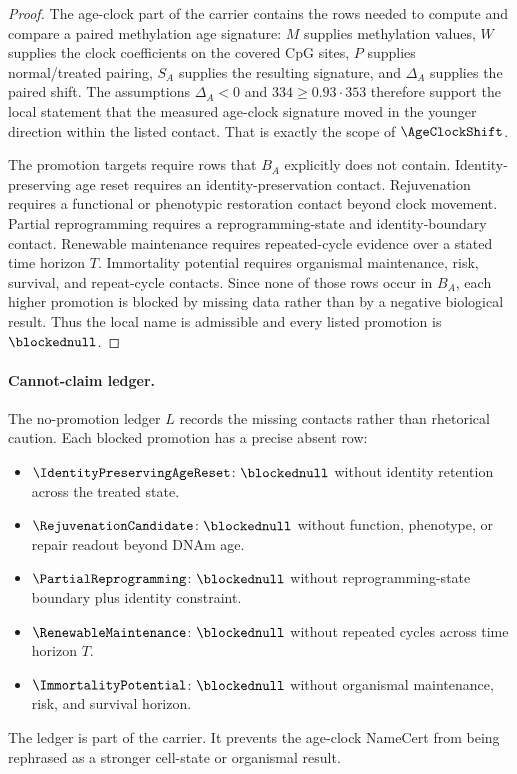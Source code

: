\begin{proof}
The age-clock part of the carrier contains the rows needed to compute and compare a paired methylation age signature: $M$ supplies methylation values, $W$ supplies the clock coefficients on the covered CpG sites, $P$ supplies normal/treated pairing, $S_A$ supplies the resulting signature, and $\Delta_A$ supplies the paired shift. The assumptions $\Delta_A<0$ and $334\geq 0.93\cdot 353$ therefore support the local statement that the measured age-clock signature moved in the younger direction within the listed contact. That is exactly the scope of $\AgeClockShift$.

The promotion targets require rows that $B_A$ explicitly does not contain. Identity-preserving age reset requires an identity-preservation contact. Rejuvenation requires a functional or phenotypic restoration contact beyond clock movement. Partial reprogramming requires a reprogramming-state and identity-boundary contact. Renewable maintenance requires repeated-cycle evidence over a stated time horizon $T$. Immortality potential requires organismal maintenance, risk, survival, and repeat-cycle contacts. Since none of those rows occur in $B_A$, each higher promotion is blocked by missing data rather than by a negative biological result. Thus the local name is admissible and every listed promotion is $\blockednull$.
\end{proof}

\paragraph{Cannot-claim ledger.}
The no-promotion ledger $L$ records the missing contacts rather than rhetorical caution. Each blocked promotion has a precise absent row:
\begin{itemize}[leftmargin=2em]
\item $\IdentityPreservingAgeReset$: $\blockednull$ without identity retention across the treated state.
\item $\RejuvenationCandidate$: $\blockednull$ without function, phenotype, or repair readout beyond DNAm age.
\item $\PartialReprogramming$: $\blockednull$ without reprogramming-state boundary plus identity constraint.
\item $\RenewableMaintenance$: $\blockednull$ without repeated cycles across time horizon $T$.
\item $\ImmortalityPotential$: $\blockednull$ without organismal maintenance, risk, and survival horizon.
\end{itemize}
The ledger is part of the carrier. It prevents the age-clock NameCert from being rephrased as a stronger cell-state or organismal result.

